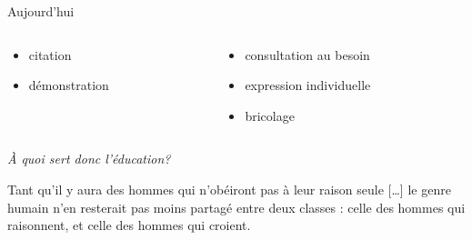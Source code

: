 \begin{frame}{Aujourd'hui}
\begin{columns}
\begin{column}{0.49\linewidth}
\begin{itemize}
			\item citation
			\item démonstration
		\end{itemize}
	\end{column}
	\begin{column}{0.49\linewidth}
		\begin{itemize}
			\item consultation au besoin
			\item expression individuelle
			\item bricolage
		\end{itemize}
	\end{column}
\end{columns}
\end{frame}
\begin{frame}
\vfill
\Huge 
\begin{center}
\emph{À quoi sert donc l'éducation?}
\end{center}
\vfill
\end{frame}
\begin{frame}
\vfill
\centering
\large
\begin{coolquote}
Tant qu'il y aura des hommes qui n'obéiront pas à leur raison seule [\ldots] le genre humain n'en resterait pas moins partagé entre deux classes : celle des hommes qui raisonnent, et celle 
des hommes qui croient.
\end{coolquote}
\vfill
\end{frame}